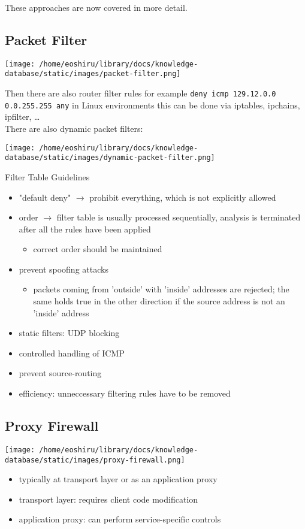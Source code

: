 \documentclass[11pt]{article}
\begin{document}
These approaches are now covered in more detail.
\subsection{Packet Filter}
\label{sec:orga1f8abd}
\begin{center}
\texttt{[image: /home/eoshiru/library/docs/knowledge-database/static/images/packet-filter.png]}
\end{center}

Then there are also router filter rules for example \texttt{deny icmp 129.12.0.0 0.0.255.255 any} in Linux environments this can be done via iptables, ipchains, ipfilter, \ldots{}\\
There are also dynamic packet filters:\\
\begin{center}
\texttt{[image: /home/eoshiru/library/docs/knowledge-database/static/images/dynamic-packet-filter.png]}
\end{center}

Filter Table Guidelines
\begin{itemize}
\item "default deny" \(\rightarrow\) prohibit everything, which is not explicitly allowed
\item order \(\rightarrow\) filter table is usually processed sequentially, analysis is terminated after all the rules have been applied
\begin{itemize}
\item correct order should be maintained
\end{itemize}
\item prevent spoofing attacks
\begin{itemize}
\item packets coming from 'outside' with 'inside' addresses are rejected; the same holds true in the other direction if the source address is not an 'inside' address
\end{itemize}
\item static filters: UDP blocking
\item controlled handling of ICMP
\item prevent source-routing
\item efficiency: unneccessary filtering rules have to be removed
\end{itemize}

\subsection{Proxy Firewall}
\label{sec:orgab60ae5}
\begin{center}
\texttt{[image: /home/eoshiru/library/docs/knowledge-database/static/images/proxy-firewall.png]}
\end{center}
\begin{itemize}
\item typically at transport layer or as an application proxy
\item transport layer: requires client code modification
\item application proxy: can perform service-specific controls
\end{itemize}
\end{document}
